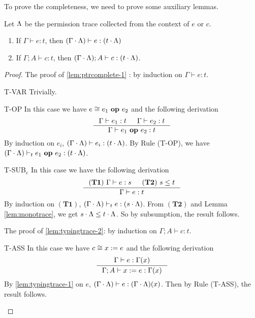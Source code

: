 {{{To prove the completeness, we need to prove some auxiliary lemmas.
\begin{lemma}\label{lem:typingtrace}
Let $\Lambda$ be the permission trace collected from the context of $e$ or $c$.
\begin{enumerate}[label=(\alph*),topsep=1pt,itemsep=-1ex,partopsep=1ex,parsep=1ex]
\item\label{lem:typingtrace-1} If $\Gamma \vdash e : t$, then $(\Gamma\cdot\Lambda) \vdash e : (t\cdot\Lambda) $
\item\label{lem:typingtrace-2} If $\Gamma;A \vdash c : t$, then $(\Gamma\cdot\Lambda); A \vdash c : (t\cdot\Lambda) $.
\end{enumerate}
\end{lemma}

\begin{proof}
The proof of \ref{lem:ptrcomplete-1} : by induction on $\Gamma \vdash e : t$.
\begin{ProofEnumDesc}
\item[T-VAR] Trivially.

\item[T-OP]  In this case we have $e \cong {e_1}~\textbf{op}~{e_2}$ and the following derivation
\begin{equation*}
\inference
{\Gamma \vdash e_1 : t & \Gamma \vdash e_2 : t}
{\Gamma \vdash \leOP{e_1}{e_2} : t}
\end{equation*}
By induction on $e_i$, $(\Gamma\cdot\Lambda) \vdash e_i : (t\cdot\Lambda)$.
By Rule {(T-OP)}, we have $(\Gamma\cdot\Lambda)\vdash_{t} {e_1}~\textbf{op}~{e_2} : (t\cdot\Lambda)$.

\item[T-SUB$_e$] In this case we have the following derivation
\begin{equation*}
\inference
{(\mathbf{T1})~\Gamma \vdash e : s & (\mathbf{T2})~s \leq t}
{\Gamma \vdash e : t}
\end{equation*}
By induction on $(\mathbf{T1})$, $(\Gamma\cdot\Lambda) \vdash_{t} e : (s\cdot\Lambda)$.
From $(\mathbf{T2})$ and Lemma \ref{lem:monotrace}, we get $s\cdot\Lambda\leq t\cdot\Lambda $. So by subsumption, the result follows.
\end{ProofEnumDesc}

The proof of \ref{lem:typingtrace-2}: by induction on $\Gamma; A \vdash c: t$.
\begin{ProofEnumDesc}
\item[T-ASS] In this case we have $c \cong {x}:={e}$ and the following derivation
\begin{equation*}
\inference
{\Gamma \vdash e : \Gamma(x)}
{\Gamma; A \vdash \lcASS{x}{e} : \Gamma(x)}
\end{equation*}
By \ref{lem:typingtrace-1} on $e$,  $(\Gamma\cdot\Lambda) \vdash e : (\Gamma\cdot\Lambda)(x)$.
Then by Rule {(T-ASS)},  the result follows.


\end{ProofEnumDesc}
\end{proof}}}}
